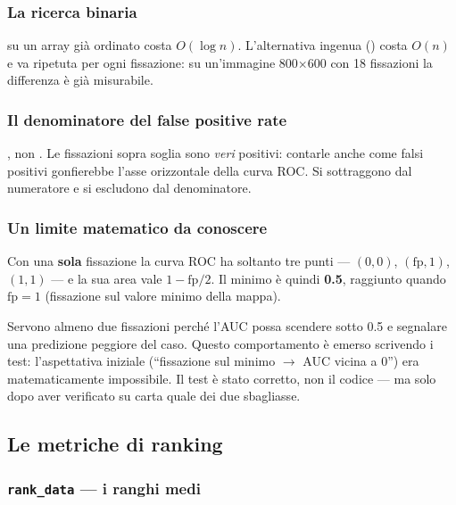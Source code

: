 \subsubsection{La ricerca binaria}

 su un array già ordinato costa $O(\log n)$. L'alternativa ingenua
() costa $O(n)$ e va ripetuta per ogni fissazione: su un'immagine
800$\times$600 con 18 fissazioni la differenza è già misurabile.

\subsubsection{Il denominatore del false positive rate}

\begin{nota}
, non . Le fissazioni sopra soglia
sono \emph{veri} positivi: contarle anche come falsi positivi gonfierebbe l'asse orizzontale
della curva ROC. Si sottraggono dal numeratore e si escludono dal denominatore.
\end{nota}

\subsubsection{Un limite matematico da conoscere}

\begin{attenzione}
Con una \textbf{sola} fissazione la curva ROC ha soltanto tre punti --- $(0,0)$,
$(\text{fp},1)$, $(1,1)$ --- e la sua area vale $1 - \text{fp}/2$. Il minimo è quindi
\textbf{0.5}, raggiunto quando $\text{fp} = 1$ (fissazione sul valore minimo della mappa).

\medskip
Servono almeno due fissazioni perché l'AUC possa scendere sotto 0.5 e segnalare una predizione
peggiore del caso. Questo comportamento è emerso scrivendo i test: l'aspettativa iniziale
(``fissazione sul minimo $\to$ AUC vicina a 0'') era matematicamente impossibile. Il test è stato
corretto, non il codice --- ma solo dopo aver verificato su carta quale dei due sbagliasse.
\end{attenzione}

\subsection{Le metriche di ranking}

\subsubsection{\texttt{rank\_data} --- i ranghi medi}

